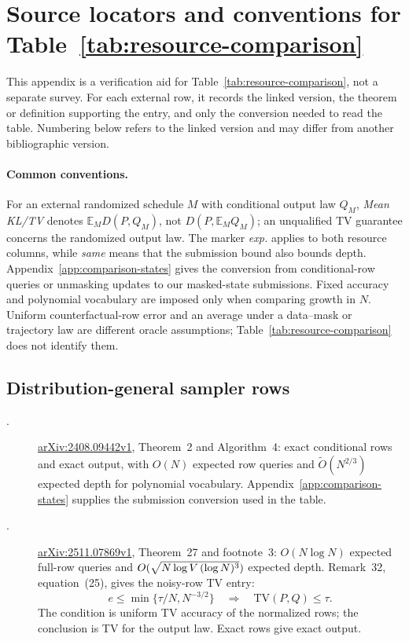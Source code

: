 \section{Source locators and conventions for Table~\ref{tab:resource-comparison}}
\label{app:oracle-comparison}

This appendix is a verification aid for Table~\ref{tab:resource-comparison},
not a separate survey.  For each external row, it records the linked version,
the theorem or definition supporting the entry, and only the conversion needed
to read the table.  Numbering below refers to the linked version and may differ
from another bibliographic version.

\paragraph{Common conventions.}
For an external randomized schedule $M$ with conditional output law $Q_M$,
\emph{Mean KL/TV} denotes $\mathbb E_M D(P,Q_M)$, not
$D(P,\mathbb E_MQ_M)$; an unqualified TV guarantee concerns the randomized
output law.  The marker \emph{exp.} applies to both resource
columns, while \emph{same} means that the submission bound also bounds depth.
Appendix~\ref{app:comparison-states} gives the conversion from conditional-row
queries or unmasking updates to our masked-state submissions.  Fixed accuracy
and polynomial vocabulary are imposed only when comparing growth in $N$.
Uniform counterfactual-row error and an average under a data--mask or trajectory
law are different oracle assumptions; Table~\ref{tab:resource-comparison}
does not identify them.

\subsection{Distribution-general sampler rows}
\label{app:comparison-exact-oracles}

\begin{description}
\item[.]
\href{https://arxiv.org/pdf/2408.09442v1}{arXiv:2408.09442v1},
Theorem~2 and Algorithm~4: exact conditional rows and exact output, with
$O(N)$ expected row queries and $\widetilde O(N^{2/3})$ expected depth for
polynomial vocabulary.  Appendix~\ref{app:comparison-states} supplies the
submission conversion used in the table.

\item[.]
\href{https://arxiv.org/pdf/2511.07869v1}{arXiv:2511.07869v1},
Theorem~27 and footnote~3: $O(N\log N)$ expected full-row queries and
$O(\sqrt{N\log V\,(\log N)^3})$ expected depth.
Remark~32, equation~(25), gives the noisy-row TV entry:
\begin{equation}
 e\le\min\{\tau/N,N^{-3/2}\}
 \quad\Longrightarrow\quad
 \mathrm{TV}(P,Q)\le\tau.
 \label{app:eq:autospec-native-tv}
\end{equation}
The condition is uniform TV accuracy of the normalized rows; the conclusion is
TV for the output law.  Exact rows give exact output.
\end{description}

